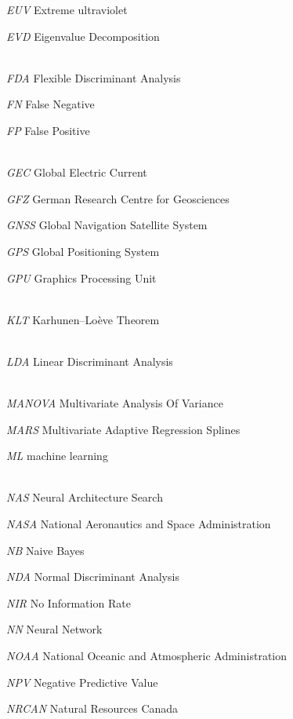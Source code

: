 \documentclass[sn-mathphys-num]{sn-jnl}%
\begin{document}
\textit{EUV} Extreme ultraviolet

\textit{EVD} Eigenvalue Decomposition


\\[2\baselineskip]

\textit{FDA} Flexible Discriminant Analysis

\textit{FN} False Negative

\textit{FP} False Positive


\\[2\baselineskip]

\textit{GEC} Global Electric Current

\textit{GFZ} German Research Centre for Geosciences

\textit{GNSS} Global Navigation Satellite System

\textit{GPS} Global Positioning System

\textit{GPU} Graphics Processing Unit


\\[2\baselineskip]

\textit{KLT} Karhunen–Loève Theorem


\\[2\baselineskip]

\textit{LDA} Linear Discriminant Analysis


\\[2\baselineskip]

\textit{MANOVA} Multivariate Analysis Of Variance

\textit{MARS} Multivariate Adaptive Regression Splines

\textit{ML} machine learning


\\[2\baselineskip]

\textit{NAS} Neural Architecture Search

\textit{NASA} National Aeronautics and Space Administration

\textit{NB} Naive Bayes

\textit{NDA} Normal Discriminant Analysis

\textit{NIR} No Information Rate

\textit{NN} Neural Network

\textit{NOAA} National Oceanic and Atmospheric Administration

\textit{NPV} Negative Predictive Value

\textit{NRCAN} Natural Resources Canada


\\[2\baselineskip]
\end{document}
